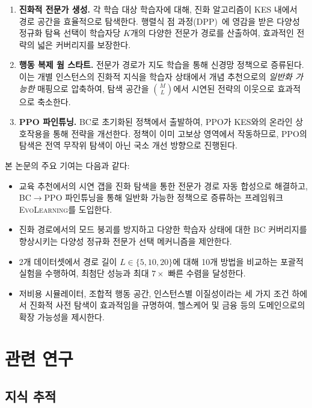 \documentclass[11pt,a4paper]{article}
\newcommand{\ours}{\textsc{EvoLearning}}
\begin{document}
\begin{enumerate}
    \item \textbf{진화적 전문가 생성.} 각 학습 대상 학습자에 대해, 진화 알고리즘이 KES 내에서 경로 공간을 효율적으로 탐색한다. 행렬식 점 과정(DPP)~\cite{kulesza2012dpp}에 영감을 받은 다양성 정규화 탐욕 선택이 학습자당 $K$개의 다양한 전문가 경로를 산출하여, 효과적인 전략의 넓은 커버리지를 보장한다.

    \item \textbf{행동 복제 웜 스타트.} 전문가 경로가 지도 학습을 통해 신경망 정책으로 증류된다. 이는 개별 인스턴스의 진화적 지식을 학습자 상태에서 개념 추천으로의 \emph{일반화 가능한} 매핑으로 압축하여, 탐색 공간을 $\binom{M}{L}$에서 시연된 전략의 이웃으로 효과적으로 축소한다.

    \item \textbf{PPO 파인튜닝.} BC로 초기화된 정책에서 출발하여, PPO가 KES와의 온라인 상호작용을 통해 전략을 개선한다. 정책이 이미 고보상 영역에서 작동하므로, PPO의 탐색은 전역 무작위 탐색이 아닌 국소 개선 방향으로 진행된다.
\end{enumerate}

본 논문의 주요 기여는 다음과 같다:
\begin{itemize}
    \item 교육 추천에서의 시연 갭을 진화 탐색을 통한 전문가 경로 자동 합성으로 해결하고, BC$\to$PPO 파인튜닝을 통해 일반화 가능한 정책으로 증류하는 프레임워크 \ours{}를 도입한다.
    \item 진화 경로에서의 모드 붕괴를 방지하고 다양한 학습자 상태에 대한 BC 커버리지를 향상시키는 다양성 정규화 전문가 선택 메커니즘을 제안한다.
    \item 2개 데이터셋에서 경로 길이 $L \in \{5, 10, 20\}$에 대해 10개 방법을 비교하는 포괄적 실험을 수행하여, 최첨단 성능과 최대 $7\times$ 빠른 수렴을 달성한다.
    \item 저비용 시뮬레이터, 조합적 행동 공간, 인스턴스별 이질성이라는 세 가지 조건 하에서 진화적 사전 탐색이 효과적임을 규명하여, 헬스케어 및 금융 등의 도메인으로의 확장 가능성을 제시한다.
\end{itemize}

\section{관련 연구}

\subsection{지식 추적}
\end{document}
